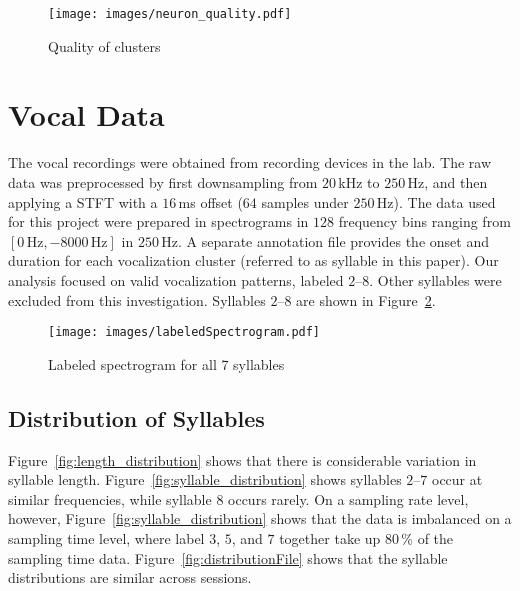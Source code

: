 \documentclass[../CLthesis.tex]{subfiles}
\begin{document}
\begin{figure}[H]
   \centering
   \texttt{[image: images/neuron\_quality.pdf]}
   \caption{Quality of clusters}
   \label{fig:neuron_quality}
\end{figure}

\section{Vocal Data}
The vocal recordings were obtained from recording devices in the lab. The raw data was preprocessed by first downsampling from $20$\,kHz to $250$\,Hz, and then applying a STFT with a $16$\,ms offset ($64$ samples under $250$\,Hz). The data used for this project were prepared in spectrograms in $128$ frequency bins ranging from $[0\,\text{Hz}, -8000\,\text{Hz}]$ in $250$\,Hz. A separate annotation file provides the onset and duration for each vocalization cluster (referred to as syllable in this paper). Our analysis focused on valid vocalization patterns, labeled $2$--$8$. Other syllables were excluded from this investigation. Syllables $2$--$8$ are shown in Figure~\ref{fig:labeled_spectrogram}.

\begin{figure}[htbp]
   \centering
   \texttt{[image: images/labeledSpectrogram.pdf]}
   \caption{Labeled spectrogram for all 7 syllables}
   \label{fig:labeled_spectrogram}
\end{figure}

\subsection{Distribution of Syllables}
Figure~\ref{fig:length_distribution} shows that there is considerable variation in syllable length. Figure~\ref{fig:syllable_distribution} shows syllables $2$--$7$ occur at similar frequencies, while syllable $8$ occurs rarely. On a sampling rate level, however, Figure~\ref{fig:syllable_distribution} shows that the data is imbalanced on a sampling time level, where label $3$, $5$, and $7$ together take up $80$\,\% of the sampling time data. Figure~\ref{fig:distributionFile} shows that the syllable distributions are similar across sessions.
\end{document}

